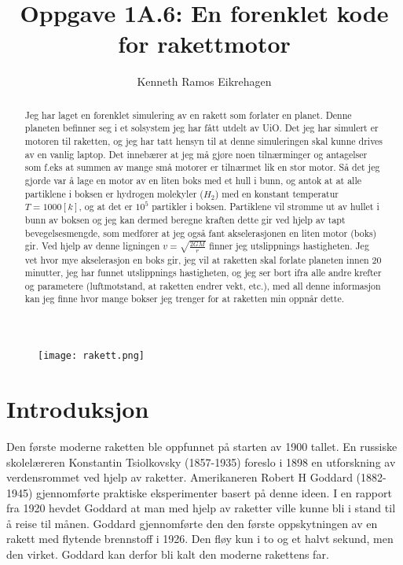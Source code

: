 \documentclass[12pt,preprint]{aastex6}
\begin{document}
\title{Oppgave 1A.6: En forenklet kode for rakettmotor}

\author{Kenneth Ramos Eikrehagen}

\newpage

\begin{figure}[h!]
\texttt{[image: rakett.png]}
\end{figure}

\begin{abstract}
Jeg har laget en forenklet simulering av en rakett som forlater en planet. Denne planeten befinner seg i et solsystem jeg har fått utdelt av UiO. Det jeg har simulert er motoren til raketten, og jeg har tatt hensyn til at denne simuleringen skal kunne drives av en vanlig laptop. Det innebærer at jeg må gjøre noen tilnærminger og antagelser som f.eks at summen av mange små motorer er tilnærmet lik en stor motor. Så det jeg gjorde var å lage en motor av en liten boks med et hull i bunn, og antok at at alle partiklene i boksen er hydrogen molekyler ($H_2$) med en konstant temperatur $T = 1000[k]$, og at det er $10^5$ partikler i boksen. Partiklene vil strømme ut av hullet i bunn av boksen og jeg kan dermed beregne kraften dette gir ved hjelp av tapt bevegelsesmengde, som medfører at jeg også fant akselerasjonen en liten motor (boks) gir.
Ved hjelp av denne ligningen $v = \sqrt{\frac{2GM}{r}}$ finner jeg utslippnings hastigheten. Jeg vet hvor mye akselerasjon en boks gir, jeg vil at raketten skal forlate planeten innen 20 minutter, jeg har funnet utslippnings hastigheten, og jeg ser bort ifra alle andre krefter og parametere (luftmotstand, at raketten endrer vekt, etc.), med all denne informasjon kan jeg finne hvor mange bokser jeg trenger for at raketten min oppnår dette. 
\end{abstract}

\section{Introduksjon}
\label{sect:intro}
Den første moderne raketten ble oppfunnet på starten av 1900 tallet. En russiske skolelæreren Konstantin Tsiolkovsky (1857-1935) foreslo i 1898 en utforskning av verdensrommet ved hjelp av raketter. Amerikaneren Robert H Goddard (1882-1945) gjennomførte praktiske eksperimenter basert på denne ideen. I en rapport fra 1920 hevdet Goddard at man med hjelp av raketter ville kunne bli i stand til å reise til månen. Goddard gjennomførte den den første oppskytningen av en rakett med flytende brennstoff i 1926. Den fløy kun i to og et halvt sekund, men den virket. Goddard kan derfor bli kalt den moderne rakettens far.
\end{document}

